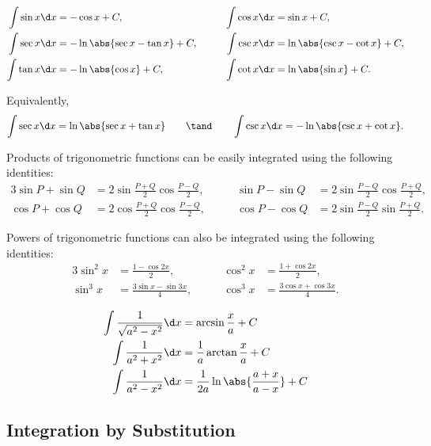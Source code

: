\begin{proposition}
    \begin{alignat*}{3}
        \int \sin x \d x &= -\cos x + C, \qquad & \int \cos x \d x &= \sin x + C,\\
        \int \sec x \d x &= -\ln \abs{\sec x - \tan x} + C, \qquad & \int \csc x \d x &= \ln \abs{\csc x - \cot x} + C,\\
        \int \tan x \d x &= -\ln \abs{\cos x} + C, \qquad & \int \cot x \d x &= \ln \abs{\sin x} + C.
    \end{alignat*}
\end{proposition}

Equivalently, \[\int \sec x \d x = \ln \abs{\sec x + \tan x} \qquad \tand \qquad \int \csc x \d x = -\ln \abs{\csc x + \cot x}.\]

Products of trigonometric functions can be easily integrated using the following identities:
\begin{alignat*}{3}
    \sin P + \sin Q &= 2 \sin \frac{P + Q}{2} \cos \frac{P - Q}{2}, \qquad & \sin P - \sin Q &= 2 \sin \frac{P - Q}{2} \cos \frac{P + Q}{2},\\
    \cos P + \cos Q &= 2 \cos \frac{P + Q}{2} \cos \frac{P - Q}{2}, \qquad & \cos P - \cos Q &= 2 \sin \frac{P - Q}{2} \sin \frac{P + Q}{2}.
\end{alignat*}

Powers of trigonometric functions can also be integrated using the following identities:
\begin{alignat*}{3}
    \sin^2 x &= \frac{1 - \cos 2x}{2}, \qquad & \cos^2 x &= \frac{1 + \cos 2x}{2},\\
    \sin^3 x &= \frac{3\sin x - \sin 3x}{4}, \qquad & \cos^3 x &= \frac{3\cos x + \cos 3x}{4}.
\end{alignat*}

\begin{proposition}
    \begin{align*}
        \int \frac1{\sqrt{a^2 - x^2}} \d x &= \arcsin \frac{x}{a} + C\\
        \int \frac1{a^2 + x^2} \d x &= \frac1{a} \arctan \frac{x}{a} + C\\
        \int \frac1{a^2 - x^2} \d x &= \frac1{2a} \ln \abs{\frac{a + x}{a-x}} + C
    \end{align*}
\end{proposition}

\subsection{Integration by Substitution}

